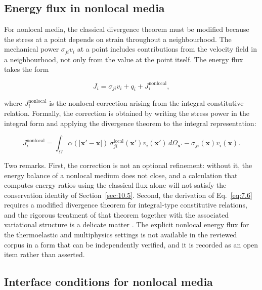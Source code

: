 \subsection{Energy flux in nonlocal media}
\label{sec:7.4}

For nonlocal media, the classical divergence theorem must be modified because the stress at a point depends on strain throughout a neighbourhood. The mechanical power $\sigma_{ji}v_i$ at a point includes contributions from the velocity field in a neighbourhood, not only from the value at the point itself. The energy flux takes the form

\begin{equation}
J_i = \sigma_{ji}v_i + q_i + J_i^{\mathrm{nonlocal}},
\label{eq:7.5}
\end{equation}

where $J_i^{\mathrm{nonlocal}}$ is the nonlocal correction arising from the integral constitutive relation. Formally, the correction is obtained by writing the stress power in the integral form and applying the divergence theorem to the integral representation:

\begin{equation}
J_i^{\mathrm{nonlocal}} = \int_\Omega \alpha(|\bm{x}' - \bm{x}|)\, \sigma_{ji}^{\mathrm{local}}(\bm{x}') v_i(\bm{x}')\, d\Omega_{\bm{x}'} - \sigma_{ji}(\bm{x})v_i(\bm{x}).
\label{eq:7.6}
\end{equation}

Two remarks. First, the correction is not an optional refinement: without it, the energy balance of a nonlocal medium does not close, and a calculation that computes energy ratios using the classical flux alone will not satisfy the conservation identity of Section~\ref{sec:10.5}. Second, the derivation of Eq.~\eqref{eq:7.6} requires a modified divergence theorem for integral-type constitutive relations, and the rigorous treatment of that theorem together with the associated variational structure is a delicate matter \cite{Polizzotto2001}. The explicit nonlocal energy flux for the thermoelastic and multiphysics settings is not available in the reviewed corpus in a form that can be independently verified, and it is recorded as an open item rather than asserted.

\subsection{Interface conditions for nonlocal media}
\label{sec:7.5}


